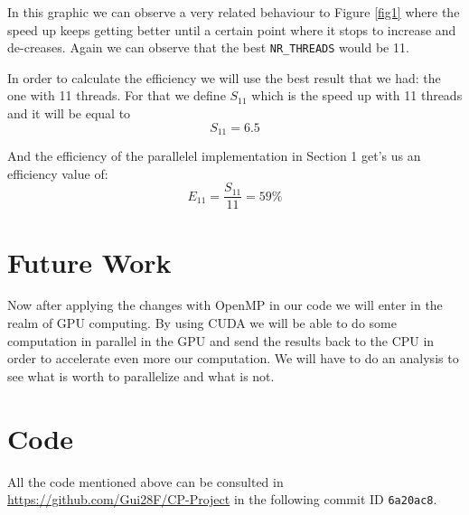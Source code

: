 \documentclass[sigconf]{acmart}
\begin{document}
In this graphic we can observe a very related behaviour to Figure \ref{fig1} where the speed up keeps getting better until a certain point where it stops to increase and de-creases. Again we can observe that the best \texttt{NR\_THREADS} would be 11.

In order to calculate the efficiency we will use the best result that we had: the one with 11 threads. For that we define $S_{11}$ which is the speed up with 11 threads and it will be equal to $$S_{11}=6.5$$

And the efficiency of the parallelel implementation in Section 1 get's us an efficiency value of: $$E_{11} = \frac{S_{11}}{11} = 59\%$$

\section{Future Work}
Now after applying the changes with OpenMP in our code we will enter in the realm of GPU computing. By using CUDA we will be able to do some computation in parallel in the GPU and send the results back to the CPU in order to accelerate even more our computation. We will have to do an analysis to see what is worth to parallelize and what is not.

\section{Code}
All the code mentioned above can be consulted in \url{https://github.com/Gui28F/CP-Project} in the following commit ID \texttt{6a20ac8}. 


\end{document}
